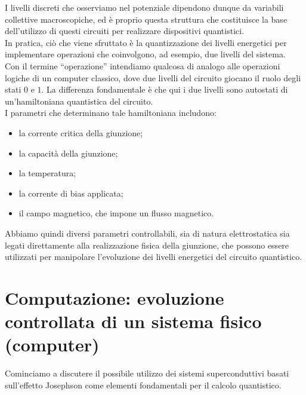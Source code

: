 I livelli discreti che osserviamo nel potenziale dipendono dunque da variabili collettive macroscopiche, ed è proprio questa struttura che costituisce la base dell'utilizzo di questi circuiti per realizzare dispositivi quantistici.\\
In pratica, ciò che viene sfruttato è la quantizzazione dei livelli energetici per implementare operazioni che coinvolgono, ad esempio, due livelli del sistema.\\
Con il termine ``operazione'' intendiamo qualcosa di analogo alle operazioni logiche di un computer classico, dove due livelli del circuito giocano il ruolo degli stati $0$ e $1$. La differenza fondamentale è che qui i due livelli sono autostati di un'hamiltoniana quantistica del circuito.\\
I parametri che determinano tale hamiltoniana includono:
\begin{itemize}[leftmargin=0.5cm]
    \item la corrente critica della giunzione;
    \item la capacità della giunzione;
    \item la temperatura;
    \item la corrente di bias applicata;
    \item il campo magnetico, che impone un flusso magnetico.
\end{itemize}
Abbiamo quindi diversi parametri controllabili, sia di natura elettrostatica sia legati direttamente alla realizzazione fisica della giunzione, che possono essere utilizzati per manipolare l'evoluzione dei livelli energetici del circuito quantistico.
\section{Computazione: evoluzione controllata di un sistema fisico (computer)}
Cominciamo a discutere il possibile utilizzo dei sistemi superconduttivi basati sull'effetto Josephson come elementi fondamentali per il calcolo quantistico.
